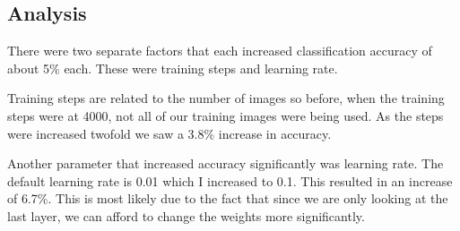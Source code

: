 \subsection*{Analysis}
There were two separate factors that each increased classification accuracy of
about 5\% each. These were training steps and learning rate.

Training steps are related to the number of images so before, when the training
steps were at 4000, not all of our training images were being used. As the steps were increased
twofold we saw a 3.8\% increase in accuracy.

Another parameter that increased accuracy significantly was learning rate. The
default learning rate is 0.01 which I increased to 0.1. This resulted in an
increase of 6.7\%. This is most likely due to the fact that since we are only
looking at the last layer, we can afford to change the weights more
significantly.

